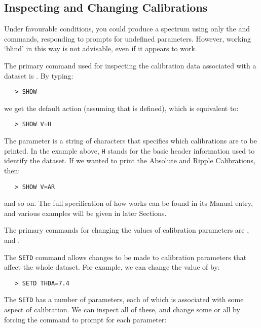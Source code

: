 \subsection{Inspecting and Changing Calibrations}

Under favourable conditions, you could produce a spectrum using only the
 and 
 commands, responding to prompts for undefined
parameters.  However, working `blind' in this way is not advisable, even if it
appears to work.

The primary command used for inspecting the calibration data associated
with a dataset is \@. By typing:

\begin{verbatim}
   > SHOW
\end{verbatim}

we get the default action (assuming that 
is defined), which is equivalent to:

\begin{verbatim}
   > SHOW V=H
\end{verbatim}

The 
 parameter is a string of characters that specifies which
calibrations are to be printed.
In the example above, \verb+H+ stands for the basic header information used to
identify the dataset.
If we wanted to print the Absolute and Ripple Calibrations, then:

\begin{verbatim}
   > SHOW V=AR
\end{verbatim}

and so on.  The full specification of how 
 works can be found in its
Manual entry, and various examples will be given in later Sections.

The primary commands for changing the values of calibration parameters
are , 
 and \@.

The \verb+SETD+ command allows changes to be made to calibration parameters
that affect the whole dataset. For example, we can change the value of
 by:

\begin{verbatim}
   > SETD THDA=7.4
\end{verbatim}

The \verb+SETD+ has a number of parameters, each of which is associated with
some aspect of calibration.  We can inspect all of these, and change some or
all by forcing the command to prompt for each parameter:

